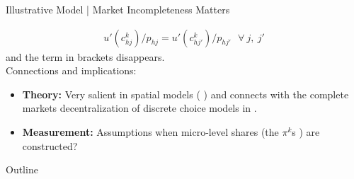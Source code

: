 \documentclass[9pt,pdftex,aspectratio=1610]{beamer}
\theoremstyle{definition}
\begin{document}
\begin{frame}[t]{Illustrative Model | Market Incompleteness Matters}
{\begin{align*}
u'( c_{hj}^k )/ p_{hj}  = u'( c_{hj'}^k )/ p_{hj'}  \ \ \ \forall\: j, \ j'
\end{align*}
and the term in brackets disappears.  \\
\medskip
Connections and implications:
\begin{itemize}
\item \textbf{Theory:} Very salient in spatial models ( {\small \citet*{miyauchi2024unpacking}} ) and connects with the complete markets decentralization of discrete choice models in {\small \citet{mongey-waugh-2}}.
\smallskip
\item \textbf{Measurement:} Assumptions when micro-level shares (the $\pi^k$s ) are constructed?
\end{itemize}
}
\end{frame}


\begin{frame}[t]{Outline}
\smallskip
{}
\bigskip
{}
\bigskip{}
\end{frame}

\end{document}
